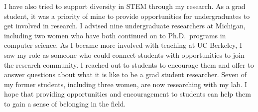 \documentclass[11pt]{article} %
\begin{document}
I have also tried to support diversity in STEM through my research.
%
As a grad student, it was a priority of mine to provide opportunities for
undergraduates to get involved in research. I advised nine undergraduate
researchers at Michigan, including two women who have both continued on to
Ph.D.\ programs in computer science.
%
As I became more involved with teaching at UC Berkeley, I saw my role as
someone who could connect students with opportunities to join the research
community.
I reached out
to students to encourage them and offer to answer questions about what it is
like to be a grad student researcher. Seven of my former students, including
three women, are now researching with my lab.
%
I hope that providing opportunities and encouragement to students can help them
to gain a sense of belonging in the field.

%
\end{document}
